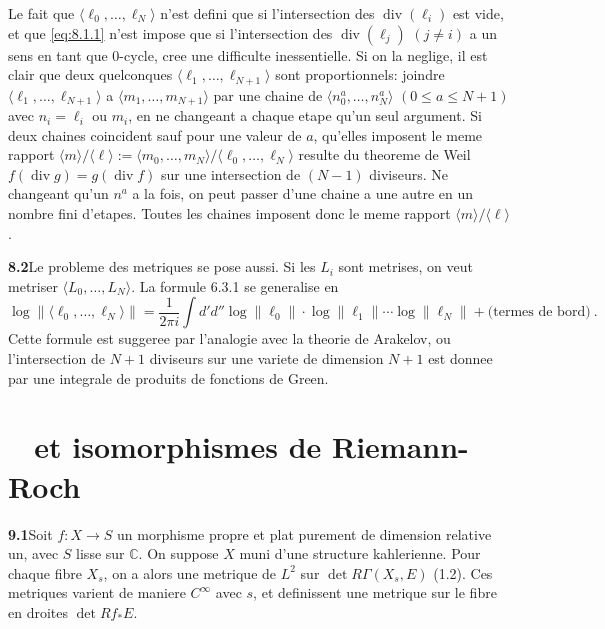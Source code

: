 \documentclass[12pt,a4paper]{article}
\theoremstyle{plain}
\theoremstyle{definition}
\theoremstyle{remark}
\DeclareMathOperator{\divm}{div}
\newcommand{\bbC}{\mathbb{C}}
\DeclareMathOperator{\ICtwo}{IC_2}
\begin{document}
Le fait que $\langle \ell_0, \ldots, \ell_N \rangle$ n'est defini que si l'intersection des $\divm(\ell_i)$ est vide, et que \eqref{eq:8.1.1} n'est impose que si l'intersection des $\divm(\ell_j)$ $(j \neq i)$ a un sens en tant que 0-cycle, cree une difficulte inessentielle. Si on la neglige, il est clair que deux quelconques $\langle \ell_1, \ldots, \ell_{N+1} \rangle$ sont proportionnels: joindre $\langle \ell_1, \ldots, \ell_{N+1} \rangle$ a $\langle m_1, \ldots, m_{N+1} \rangle$ par une chaine de $\langle n_0^a, \ldots, n_N^a \rangle$ $(0 \leq a \leq N+1)$ avec $n_i = \ell_i$ ou $m_i$, en ne changeant a chaque etape qu'un seul argument. Si deux chaines coincident sauf pour une valeur de $a$, qu'elles imposent le meme rapport $\langle m \rangle/\langle \ell \rangle := \langle m_0, \ldots, m_N\rangle/\langle \ell_0, \ldots, \ell_N\rangle$ resulte du theoreme de Weil $f(\divm g) = g(\divm f)$ sur une intersection de $(N-1)$ diviseurs. Ne changeant qu'un $n^a$ a la fois, on peut passer d'une chaine a une autre en un nombre fini d'etapes. Toutes les chaines imposent donc le meme rapport $\langle m \rangle/\langle \ell \rangle$.

\medskip
\noindent\textbf{8.2}\quad Le probleme des metriques se pose aussi. Si les $L_i$ sont metrises, on veut metriser $\langle L_0, \ldots, L_N \rangle$. La formule 6.3.1 se generalise en
\begin{equation}
\label{eq:8.2.1}
\log\|\langle \ell_0, \ldots, \ell_N \rangle\| = \frac{1}{2\pi i} \int d'd''\log\|\ell_0\| \cdot \log\|\ell_1\| \cdots \log\|\ell_N\| + \text{(termes de bord)} \ .
\end{equation}
Cette formule est suggeree par l'analogie avec la theorie de Arakelov, ou l'intersection de $N+1$ diviseurs sur une variete de dimension $N+1$ est donnee par une integrale de produits de fonctions de Green.


\section{$\ICtwo$ et isomorphismes de Riemann-Roch}

\noindent\textbf{9.1}\quad Soit $f: X \to S$ un morphisme propre et plat purement de dimension relative un, avec $S$ lisse sur $\bbC$. On suppose $X$ muni d'une structure kahlerienne. Pour chaque fibre $X_s$, on a alors une metrique de $L^2$ sur $\det R\Gamma(X_s, E)$ (1.2). Ces metriques varient de maniere $C^\infty$ avec $s$, et definissent une metrique sur le fibre en droites $\det Rf_* E$.
\end{document}
